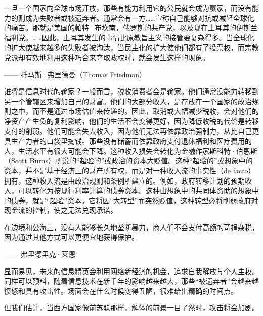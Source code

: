 \begin{tcolorbox}
一旦一个国家向全球市场开放，那些有能力利用它的公民就会成为赢家，而没有能力的则成为失败者或被遗弃者。通常会有一方……宣称自己能够对抗或减轻全球化的痛苦。那就是美国的帕特·布坎南，俄罗斯的共产党，以及现在土耳其的伊斯兰福利党。……因此，土耳其发生的事情比原教旨主义的接管要复杂得多。当全球化的扩大使越来越多的失败者被淘汰，当民主化的扩大使他们都有了投票权，而宗教党派却有效地利用这种巧合来夺取政权时，就会发生这样的现象。
\begin{flushright}
—— 托马斯·弗里德曼（Thomas Friedman） 
\end{flushright}
\end{tcolorbox}

谁将是信息时代的输家？一般而言，税收消费者会是输家。他们通常没能力转移到另一个管辖区来增加自己的财富。他们的大部分收入，是存放在一个国家的政治规则之中，而不是通过市场估值来传递的。因此，取消或大幅减少税收，会对他们的净资产产生负的复利影响，他们的生活不会变得更好，因为降低收税的代价是转移支付的削弱。他们可能会失去收入，因为他们无法再依靠政治强制力，从比自己更具生产力者的口袋里掏钱。那些没有储蓄而依靠政府支付退休福利和医疗费用的人，生活水平有很大可能会下降。这种收入损失会转化为金融作家斯科特·伯恩斯（Scott Burns）所说的“超验的”或政治的资本大贬值。这种“超验的”或想象中的资本，并不是基于经济上的财产所有权，而是对一种收入流的事实性（de facto）拥有，这种收入流是由政治规则和条例所建立的。例如，政府转移计划的预期收入，可以转化为按现行利率计算的债券资本。这种由想象中的共同体资助的想象中的债券，就是“超验”资本。它将因“大转型”而突然贬值，这种转型必将削弱政府对现金流的控制，使之无法兑现承诺。

\begin{tcolorbox}
在边境和公海上，没有人能够长久地垄断暴力，商人们不会支付高额的苛捐杂税，因为通过其他方式可以更便宜地获得保护。
\begin{flushright}
—— 弗里德里克·莱恩
\end{flushright}
\end{tcolorbox}

显而易见，未来的信息精英会利用网络新经济的机会，追求自我解放与个人主权。同样可以预料，随着信息技术在新千年的影响越来越大，那些“被遗弃者”会越来越愤怒和具有攻击性。场面会在什么时候变得丑陋，很难给出精确的时间点。

但我们估计，当西方国家像前苏联那样，解体的前景一目了然时，攻击将会加剧。

